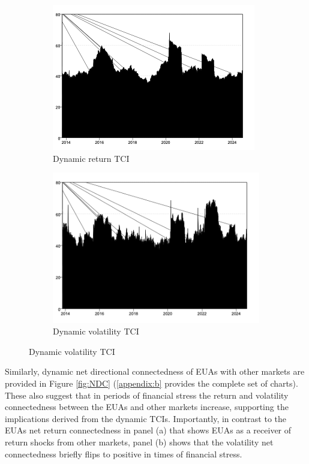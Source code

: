 \documentclass[preprint, 3p,
authoryear]{elsarticle} %
\begin{document}
\begin{figure}[H]
  \caption{Dynamic Return and Volatility Connectedness (Jan 2013 – Aug 2024)}
  \label{fig:dynTCI}
      \begin{subfigure}[b]{\textwidth}
        \centering
        \caption{Dynamic return TCI}
        \label{fig:dynretTCI}
        \includegraphics[width = 0.5\linewidth]{../figures/2a-DynRetTCI}
      \end{subfigure}
      \begin{subfigure}[b]{\textwidth}
        \centering
        \bigskip
        \caption{Dynamic volatility TCI}
        \label{fig:dynvolTCI}
        \includegraphics[width = 0.5\linewidth]{../figures/2b-DynVolTCI}
      \end{subfigure}
\end{figure}

Similarly, dynamic net directional connectedness of EUAs with other
markets are provided in Figure \ref{fig:NDC} (\ref{appendix:b} provides
the complete set of charts). These also suggest that in periods of
financial stress the return and volatility connectedness between the
EUAs and other markets increase, supporting the implications derived
from the dynamic TCIs. Importantly, in contrast to the EUAs net return
connectedness in panel (a) that shows EUAs as a receiver of return
shocks from other markets, panel (b) shows that the volatility net
connectedness briefly flips to positive in times of financial stress.
\end{document}

